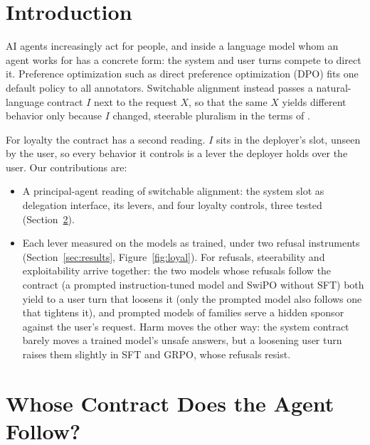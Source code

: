\documentclass[letterpaper]{article} %
\begin{document}
\section{Introduction}

AI agents increasingly act for people, and inside a language model whom an agent works for has a concrete form: the system and user turns compete to direct it. Preference optimization such as direct preference optimization (DPO) \cite{rafailov2023direct} fits one default policy to all annotators. Switchable alignment instead passes a natural-language contract $I$ next to the request $X$, so that the same $X$ yields different behavior only because $I$ changed, steerable pluralism in the terms of \citet{sorensen2024roadmap}.



For loyalty the contract has a second reading. $I$ sits in the deployer's slot, unseen by the user, so every behavior it controls is a lever the deployer holds over the user. Our contributions are:
\begin{itemize}
    \item A principal-agent reading of switchable alignment: the system slot as delegation interface, its levers, and four loyalty controls, three tested (Section~\ref{sec:loyalty}).
    \item Each lever measured on the models as trained, under two refusal instruments (Section~\ref{sec:results}, Figure~\ref{fig:loyal}). For refusals, steerability and exploitability arrive together: the two models whose refusals follow the contract (a prompted instruction-tuned model and SwiPO without SFT) both yield to a user turn that loosens it (only the prompted model also follows one that tightens it), and prompted models of \nSponsorFamilies{} families serve a hidden sponsor against the user's request. Harm moves the other way: the system contract barely moves a trained model's unsafe answers, but a loosening user turn raises them slightly in SFT and GRPO, whose refusals resist.
\end{itemize}



\section{Whose Contract Does the Agent Follow?}
\label{sec:loyalty}
\end{document}
